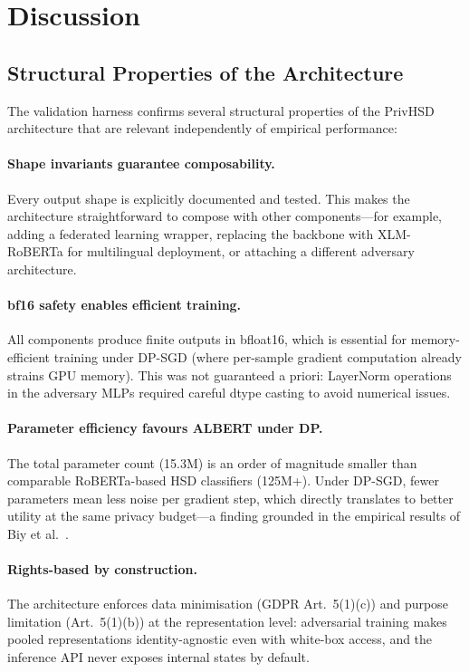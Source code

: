 \documentclass{article}
\begin{document}
\section{Discussion}
\label{sec:discussion}

\subsection{Structural Properties of the Architecture}

The validation harness confirms several structural properties of the
PrivHSD architecture that are relevant independently of empirical
performance:

\paragraph{Shape invariants guarantee composability.}
Every output shape is explicitly documented and tested. This makes the
architecture straightforward to compose with other components---for
example, adding a federated learning wrapper, replacing the backbone
with XLM-RoBERTa for multilingual deployment, or attaching a different
adversary architecture.

\paragraph{bf16 safety enables efficient training.}
All components produce finite outputs in bfloat16, which is essential for
memory-efficient training under DP-SGD (where per-sample gradient
computation already strains GPU memory). This was not guaranteed a
priori: LayerNorm operations in the adversary MLPs required careful
dtype casting to avoid numerical issues.

\paragraph{Parameter efficiency favours ALBERT under DP.}
The total parameter count (15.3M) is an order of magnitude smaller than
comparable RoBERTa-based HSD classifiers (125M+). Under DP-SGD, fewer
parameters mean less noise per gradient step, which directly translates
to better utility at the same privacy budget---a finding grounded in
the empirical results of Biy et al.~\cite{biy2025privacy}.

\paragraph{Rights-based by construction.}
The architecture enforces data minimisation (GDPR Art.~5(1)(c)) and
purpose limitation (Art.~5(1)(b)) at the representation level:
adversarial training makes pooled representations identity-agnostic even
with white-box access, and the inference API never exposes internal
states by default.
\end{document}
